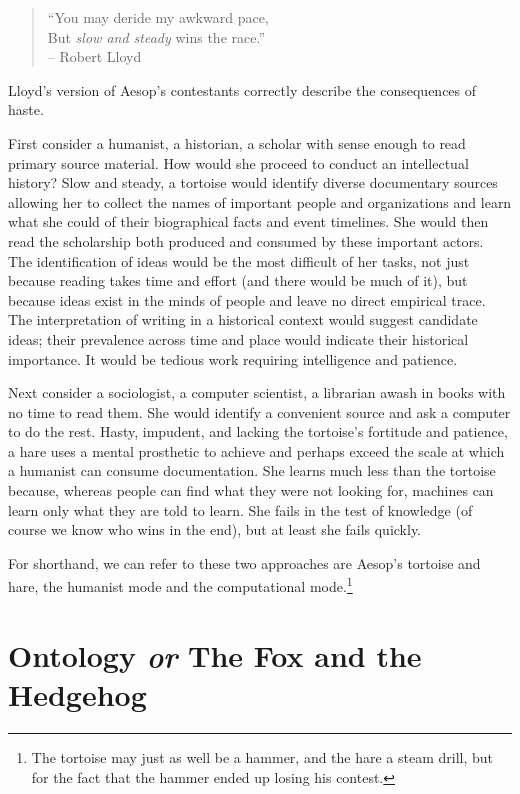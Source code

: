 \documentclass[]{book}
\let\rmarkdownfootnote\footnote%
\def\footnote{\protect\rmarkdownfootnote}
\begin{document}
\begin{quote}
``You may deride my awkward pace,\\
But \emph{slow and steady} wins the race.''\\
-- Robert Lloyd \citeyearpar[38]{Lloyd1762Poems}
\end{quote}

Lloyd's version of Aesop's contestants correctly describe the
consequences of haste.

First consider a humanist, a historian, a scholar with sense enough to
read primary source material. How would she proceed to conduct an
intellectual history? Slow and steady, a tortoise would identify diverse
documentary sources allowing her to collect the names of important
people and organizations and learn what she could of their biographical
facts and event timelines. She would then read the scholarship both
produced and consumed by these important actors. The identification of
ideas would be the most difficult of her tasks, not just because reading
takes time and effort (and there would be much of it), but because ideas
exist in the minds of people and leave no direct empirical trace. The
interpretation of writing in a historical context would suggest
candidate ideas; their prevalence across time and place would indicate
their historical importance. It would be tedious work requiring
intelligence and patience.

Next consider a sociologist, a computer scientist, a librarian awash in
books with no time to read them. She would identify a convenient source
and ask a computer to do the rest. Hasty, impudent, and lacking the
tortoise's fortitude and patience, a hare uses a mental prosthetic to
achieve and perhaps exceed the scale at which a humanist can consume
documentation. She learns much less than the tortoise because, whereas
people can find what they were not looking for, machines can learn only
what they are told to learn. She fails in the test of knowledge (of
course we know who wins in the end), but at least she fails quickly.

For shorthand, we can refer to these two approaches are Aesop's tortoise
and hare, the humanist mode and the computational mode.\footnote{The
  tortoise may just as well be a hammer, and the hare a steam drill, but
  for the fact that the hammer ended up losing his contest.}

\section{\texorpdfstring{Ontology \emph{or} The Fox and the
Hedgehog}{Ontology or The Fox and the Hedgehog}}\label{ontology-or-the-fox-and-the-hedgehog}
\end{document}
